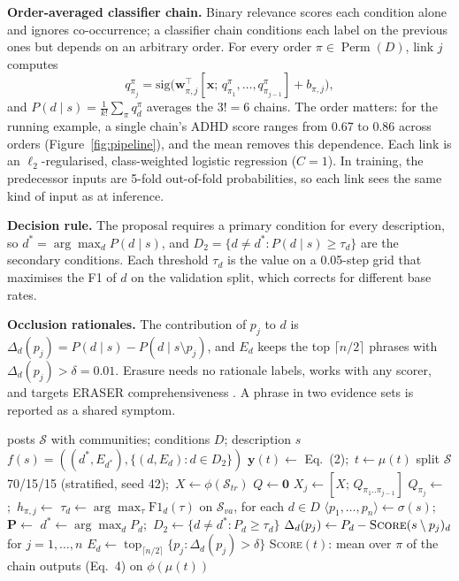 \documentclass[sigconf]{acmart}
\newcommand{\Perm}{\operatorname{Perm}}
\newcommand{\topm}{\operatorname{top}}
\newcommand{\core}{\textsc{CoRE}}
\begin{document}
\textbf{Order-averaged classifier chain.} Binary relevance scores each condition alone and ignores co-occurrence; a classifier chain \cite{read2011classifier} conditions each label on the previous ones but depends on an arbitrary order. For every order $\pi\in\Perm(D)$, link $j$ computes
\begin{equation}
q^{\pi}_{\pi_j}=\mathrm{sig}\big(\mathbf{w}_{\pi,j}^{\top}[\mathbf{x};\,q^{\pi}_{\pi_1},\dots,q^{\pi}_{\pi_{j-1}}]+b_{\pi,j}\big),
\end{equation}
and $P(d\mid s)=\frac{1}{k!}\sum_{\pi}q^{\pi}_{d}$ averages the $3!=6$ chains. The order matters: for the running example, a single chain's ADHD score ranges from 0.67 to 0.86 across orders (Figure~\ref{fig:pipeline}), and the mean removes this dependence. Each link is an $\ell_2$-regularised, class-weighted logistic regression ($C=1$). In training, the predecessor inputs are 5-fold out-of-fold probabilities, so each link sees the same kind of input as at inference.

\textbf{Decision rule.} The proposal requires a primary condition for every description, so $d^{*}=\arg\max_{d}P(d\mid s)$, and $D_2=\{d\ne d^{*}:P(d\mid s)\ge\tau_d\}$ are the secondary conditions. Each threshold $\tau_d$ is the value on a 0.05-step grid that maximises the F1 of $d$ on the validation split, which corrects for different base rates.

\textbf{Occlusion rationales.} The contribution of $p_j$ to $d$ is $\Delta_d(p_j)=P(d\mid s)-P(d\mid s\setminus p_j)$, and $E_d$ keeps the top $\lceil n/2\rceil$ phrases with $\Delta_d(p_j)>\delta=0.01$. Erasure \cite{li2016erasure} needs no rationale labels, works with any scorer, and targets ERASER comprehensiveness \cite{deyoung2020eraser}. A phrase in two evidence sets is reported as a shared symptom.

\begin{algorithm}[t]
\caption{\core{} training and inference}\label{alg:core}
\small
\begin{algorithmic}[1]
\Require posts $\mathcal{S}$ with communities; conditions $D$; description $s$
\Ensure $f(s)=((d^{*},E_{d^{*}}),\{(d,E_d):d\in D_2\})$
 $\mathbf{y}(t)\gets$ Eq.~(2);\ $t\gets\mu(t)$ \EndFor
\State split $\mathcal{S}$ 70/15/15 (stratified, seed 42);\ $X\gets\phi(\mathcal{S}_{tr})$
\For{$\pi\in\Perm(D)$} $Q\gets\mathbf{0}$
   $X_j\gets[X;\,Q_{\pi_1..\pi_{j-1}}]$
    \State $Q_{\pi_j}\gets$ ;\ $h_{\pi,j}\gets$ 
  \EndFor
\EndFor
\State $\tau_d\gets\arg\max_{\tau}\mathrm{F1}_d(\tau)$ on $\mathcal{S}_{va}$, for each $d\in D$
\State $\langle p_1,\dots,p_n\rangle\gets\sigma(s)$;\ $\mathbf{P}\gets$ 
\State $d^{*}\gets\arg\max_d P_d$;\ $D_2\gets\{d\ne d^{*}:P_d\ge\tau_d\}$
  \State $\Delta_d(p_j)\gets P_d-\textproc{Score}(s\setminus p_j)_d$ for $j=1,\dots,n$
  \State $E_d\gets\topm_{\lceil n/2\rceil}\{p_j:\Delta_d(p_j)>\delta\}$
\EndFor
\Statex \textsc{Score}$(t)$: mean over $\pi$ of the chain outputs (Eq.~4) on $\phi(\mu(t))$
\end{algorithmic}
\end{algorithm}
\end{document}
